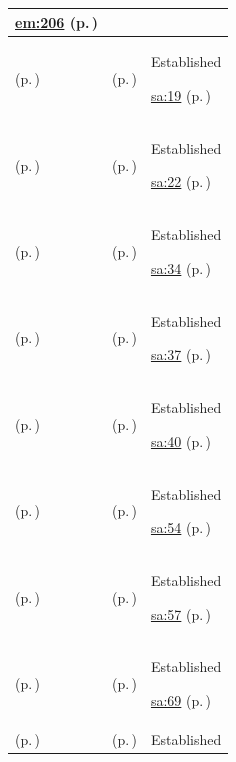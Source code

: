 \begin{longtable}{|>{\raggedright\arraybackslash}p{0.27\TableWidth}|>{\raggedright\arraybackslash}p{0.27\TableWidth}|>{\raggedright\arraybackslash}p{0.46\TableWidth}|}
 \hyperref[rad:em:193]{em:206} (p.\,\pageref{rad:em:193})\\\hline
\nameref{service:demographic-intake-service} (p.\,\pageref{service:demographic-intake-service}) & \nameref{feature:feat-sa-01} (p.\,\pageref{feature:feat-sa-01}) & Established

 \hyperref[rad:sa:12]{sa:19} (p.\,\pageref{rad:sa:12})\\\hline
\nameref{service:demographic-update-notification} (p.\,\pageref{service:demographic-update-notification}) & \nameref{feature:feat-sa-02} (p.\,\pageref{feature:feat-sa-02}) & Established

 \hyperref[rad:sa:12]{sa:22} (p.\,\pageref{rad:sa:12})\\\hline
\nameref{service:referral-submission-service} (p.\,\pageref{service:referral-submission-service}) & \nameref{feature:feat-sa-03} (p.\,\pageref{feature:feat-sa-03}) & Established

 \hyperref[rad:sa:28]{sa:34} (p.\,\pageref{rad:sa:28})\\\hline
\nameref{service:referral-context-query} (p.\,\pageref{service:referral-context-query}) & \nameref{feature:feat-sa-04} (p.\,\pageref{feature:feat-sa-04}) & Established

 \hyperref[rad:sa:28]{sa:37} (p.\,\pageref{rad:sa:28})\\\hline
\nameref{service:referral-status-outcome-service} (p.\,\pageref{service:referral-status-outcome-service}) & \nameref{feature:feat-sa-05} (p.\,\pageref{feature:feat-sa-05}) & Established

 \hyperref[rad:sa:28]{sa:40} (p.\,\pageref{rad:sa:28})\\\hline
\nameref{service:appointment-notification-ingress} (p.\,\pageref{service:appointment-notification-ingress}) & \nameref{feature:feat-sa-06} (p.\,\pageref{feature:feat-sa-06}) & Established

 \hyperref[rad:sa:48]{sa:54} (p.\,\pageref{rad:sa:48})\\\hline
\nameref{service:appointment-schedule-query} (p.\,\pageref{service:appointment-schedule-query}) & \nameref{feature:feat-sa-07} (p.\,\pageref{feature:feat-sa-07}) & Established

 \hyperref[rad:sa:48]{sa:57} (p.\,\pageref{rad:sa:48})\\\hline
\nameref{service:encounter-context-resolution} (p.\,\pageref{service:encounter-context-resolution}) & \nameref{feature:feat-sa-08} (p.\,\pageref{feature:feat-sa-08}) & Established

 \hyperref[rad:sa:63]{sa:69} (p.\,\pageref{rad:sa:63})\\\hline
\nameref{service:encounter-lifecycle-event-notification} (p.\,\pageref{service:encounter-lifecycle-event-notification}) & \nameref{feature:feat-sa-09} (p.\,\pageref{feature:feat-sa-09}) & Established


\end{longtable}
